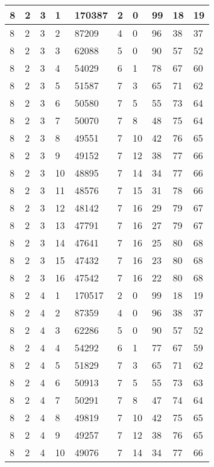 \begin{table}[!ht]
\begin{tabular}{|l|l|l|l|l|l|l|l|l|l|}
        8 & 2 & 3 & 1 & 170387 & 2 & 0 & 99 & 18 & 19 \\ \hline
        8 & 2 & 3 & 2 & 87209 & 4 & 0 & 96 & 38 & 37 \\ \hline
        8 & 2 & 3 & 3 & 62088 & 5 & 0 & 90 & 57 & 52 \\ \hline
        8 & 2 & 3 & 4 & 54029 & 6 & 1 & 78 & 67 & 60 \\ \hline
        8 & 2 & 3 & 5 & 51587 & 7 & 3 & 65 & 71 & 62 \\ \hline
        8 & 2 & 3 & 6 & 50580 & 7 & 5 & 55 & 73 & 64 \\ \hline
        8 & 2 & 3 & 7 & 50070 & 7 & 8 & 48 & 75 & 64 \\ \hline
        8 & 2 & 3 & 8 & 49551 & 7 & 10 & 42 & 76 & 65 \\ \hline
        8 & 2 & 3 & 9 & 49152 & 7 & 12 & 38 & 77 & 66 \\ \hline
        8 & 2 & 3 & 10 & 48895 & 7 & 14 & 34 & 77 & 66 \\ \hline
        8 & 2 & 3 & 11 & 48576 & 7 & 15 & 31 & 78 & 66 \\ \hline
        8 & 2 & 3 & 12 & 48142 & 7 & 16 & 29 & 79 & 67 \\ \hline
        8 & 2 & 3 & 13 & 47791 & 7 & 16 & 27 & 79 & 67 \\ \hline
        8 & 2 & 3 & 14 & 47641 & 7 & 16 & 25 & 80 & 68 \\ \hline
        8 & 2 & 3 & 15 & 47432 & 7 & 16 & 23 & 80 & 68 \\ \hline
        8 & 2 & 3 & 16 & 47542 & 7 & 16 & 22 & 80 & 68 \\ \hline
        8 & 2 & 4 & 1 & 170517 & 2 & 0 & 99 & 18 & 19 \\ \hline
        8 & 2 & 4 & 2 & 87359 & 4 & 0 & 96 & 38 & 37 \\ \hline
        8 & 2 & 4 & 3 & 62286 & 5 & 0 & 90 & 57 & 52 \\ \hline
        8 & 2 & 4 & 4 & 54292 & 6 & 1 & 77 & 67 & 59 \\ \hline
        8 & 2 & 4 & 5 & 51829 & 7 & 3 & 65 & 71 & 62 \\ \hline
        8 & 2 & 4 & 6 & 50913 & 7 & 5 & 55 & 73 & 63 \\ \hline
        8 & 2 & 4 & 7 & 50291 & 7 & 8 & 47 & 74 & 64 \\ \hline
        8 & 2 & 4 & 8 & 49819 & 7 & 10 & 42 & 75 & 65 \\ \hline
        8 & 2 & 4 & 9 & 49257 & 7 & 12 & 38 & 76 & 65 \\ \hline
        8 & 2 & 4 & 10 & 49076 & 7 & 14 & 34 & 77 & 66 \\ \hline

\end{tabular}
\end{table}
